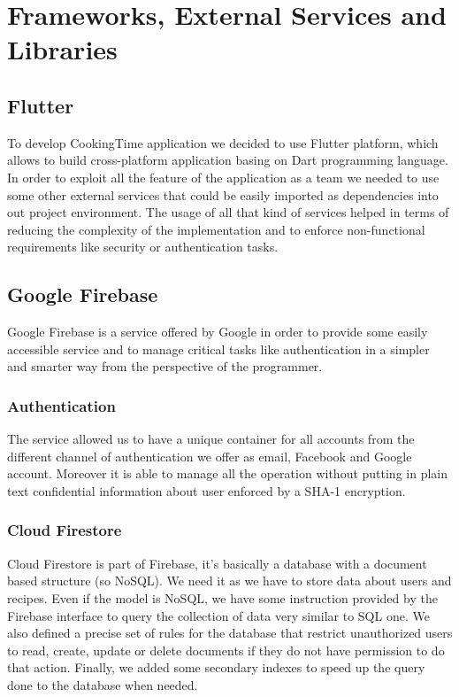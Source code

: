 \chapter{Frameworks, External Services and Libraries}

\section{Flutter}
To develop CookingTime application we decided to use Flutter platform, which allows to build cross-platform application basing on Dart programming language. 
In order to exploit all the feature of the application as a team we needed to use some other external services that could be easily imported as dependencies into out project environment. 
The usage of all that kind of services helped in terms of reducing the complexity of the implementation and to enforce non-functional requirements like security or authentication tasks.

\section{Google Firebase}
Google Firebase is a service offered by Google in order to provide some easily accessible service and to manage critical tasks like authentication in a simpler and smarter way from the perspective of the programmer.

\subsection{Authentication}
The service allowed us to have a unique container for all accounts from the different channel of authentication we offer as email, Facebook and Google account. 
Moreover it is able to manage all the operation without putting in plain text confidential information about user enforced by a SHA-1 encryption.

\subsection{Cloud Firestore}
Cloud Firestore is part of Firebase, it's basically a database with a document based structure (so NoSQL).
We need it as we have to store data about users and recipes.
Even if the model is NoSQL, we have some instruction provided by the Firebase interface to query the collection of data very similar to SQL one.
We also defined a precise set of rules for the database that restrict unauthorized users to read, create, update or delete documents if they do not have permission to do that action.
Finally, we added some secondary indexes to speed up the query done to the database when needed.

